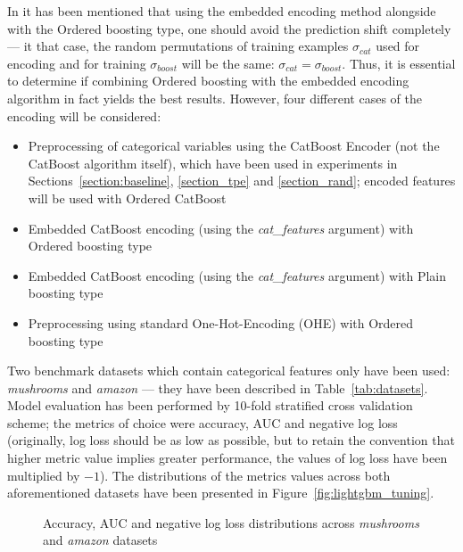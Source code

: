 \documentclass[magisterska, english]{pwr_wmat_praca_dyplomowa}
\theoremstyle{plain}
\numberwithin{theorem}{chapter}
\theoremstyle{definition}
\numberwithin{theorem}{chapter}
\begin{document}
In \cite{catboost} it has been mentioned that using the embedded encoding method alongside with the Ordered boosting type, one should avoid the prediction shift completely --- it that case, the random permutations of training examples $\sigma_{cat}$ used for encoding and for training $\sigma_{boost}$ will be the same: $\sigma_{cat} = \sigma_{boost}$. Thus, it is essential to determine if combining Ordered boosting with the embedded encoding algorithm in fact yields the best results. However, four different cases of the encoding will be considered:

\begin{itemize}
    \item Preprocessing of categorical variables using the CatBoost Encoder (not the CatBoost algorithm itself), which have been used in experiments in Sections~\ref{section:baseline}, \ref{section_tpe} and \ref{section_rand}; encoded features will be used with Ordered CatBoost
    \item Embedded CatBoost encoding (using the \emph{cat\_features} argument) with Ordered boosting type
    \item Embedded CatBoost encoding (using the \emph{cat\_features} argument) with Plain boosting type
    \item Preprocessing using standard One-Hot-Encoding (OHE) with Ordered boosting type
\end{itemize}

Two benchmark datasets which contain categorical features only have been used: \emph{mushrooms} and \emph{amazon} --- they have been described in Table~\ref{tab:datasets}. Model evaluation has been performed by 10-fold stratified cross validation scheme; the metrics of choice were accuracy, AUC and negative log loss (originally, log loss should be as low as possible, but to retain the convention that higher metric value implies greater performance, the values of log loss have been multiplied by $-1$). The distributions of the metrics values across both aforementioned datasets have been presented in Figure~\ref{fig:lightgbm_tuning}.

\begin{figure}[H]
	\centering
	\caption{Accuracy, AUC and negative log loss distributions across \emph{mushrooms} and \emph{amazon} datasets}
	\label{fig:catboost_categorical_results}
\end{figure}
\end{document}
